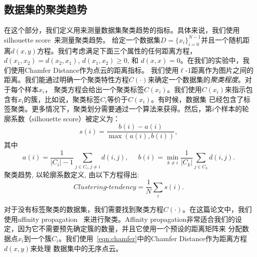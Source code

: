 \documentclass[bachelor, nocolorlinks, printoneside]{seuthesis} %
\begin{document}
\begin{Main}
\section{数据集的聚类趋势}
\label{sec:metric_on_dataset}
在这个部分，我们定义用来测量数据集聚类趋势的指标。具体来说，我们使用silhouette score~\cite{van2015using}来测量聚类趋势。
给定一个数据集$D = \{x_i\}_{i=0}^{N-1}$并且一个随机距离$d(x,y)$方程。我们考虑满足下面三个属性的任何距离方程，
$d(x_1,x_2)=d(x_2,x_1)$, $d(x_1,x_2)\ge 0$, 和 $d(x,x)=0$。在我们的实验中，我们使用Chamfer Distance作为点云的距离指标。
我们使用$\ell$-1距离作为图片之间的距离。我们能通过明确一个聚类特性方程$C(\cdot)$来确定一个数据集的\emph{聚类程度}。对于每个样本$x_i$，
聚类方程会给出一个聚类标签$C(x_i)$。我们使用$C(x_i)$来指示包含有$x_i$的簇，比如说，聚类标签$C_i$等价于$C(x_i)$。有时候，数据集
已经包含了标签聚类。更多情况下，聚类划分需要通过一个算法来获得。然后，第$i$个样本的轮廓系数（silhouette score）被定义为：
\begin{equation}
    s(i) = \frac{b(i)-a(i)}{\max(a(i),b(i))},
\end{equation}
其中
\begin{equation}
    a(i) = \frac{1}{|C_i|-1}\sum_{j\in C_i, j\neq i}d(i,j),\;\;\;\;\;
    b(i) = \min_{k\neq i}\frac{1}{|C_k|}\sum_{j\in C_k}d(i,j).
\end{equation}
聚类趋势, 以轮廓系数定义, 由以下方程得出:
\begin{equation}
    \textit{Clustering-tendency} = \frac{1}{N}\sum_i s(i).
\end{equation}

对于没有标签聚类的数据集，我们需要找到聚类方程$C(\cdot)$。在这篇论文中，我们使用affinity propagation~\cite{wang2008adaptive}
来进行聚类。Affinity propagation非常适合我们的设定，因为它不需要预先确定簇的数量，并且它使用一个预设的距离矩阵来
分配数据点$x_i$到一个簇$C_i$。我们使用~\eqref{eqn:chamfer}中的Chamfer Distance作为距离方程$d(x,y)$来处理
数据集中的无序点云。


\end{Main}
\end{document}
